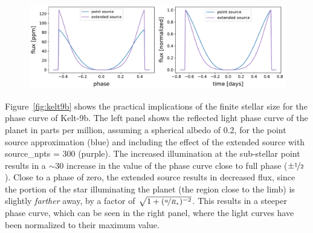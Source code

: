 \documentclass[modern]{aastex62}
\begin{document}
\begin{figure}[p!]
    \begin{centering}
        \includegraphics[width=\linewidth]{figures/kelt9b.pdf}
    \end{centering}
\end{figure}

Figure~\ref{fig:kelt9b} shows the practical implications of the finite
stellar size for the phase curve of Kelt-9b. The left panel shows the
reflected light phase curve of the planet in parts per million, assuming
a spherical albedo of 0.2, for the point source approximation
(blue) and including the effect of the extended source with
\textsf{source\_npts} = 300 (purple). The increased
illumination at the sub-stellar point results in a ${\sim}30$ increase
in the value of the phase curve close to full phase ($\pm\nicefrac{1}{2}$).
Close to a phase of zero, the extended source results in decreased
flux, since the portion of the star illuminating the planet (the region
close to the limb) is slightly
\emph{farther} away, by a factor of
$\sqrt{1 + (\nicefrac{a}{R_\star})^{-2}}$. This results in a steeper
phase curve, which can be seen in the right panel, where the light curves
have been normalized to their maximum value.
\end{document}
